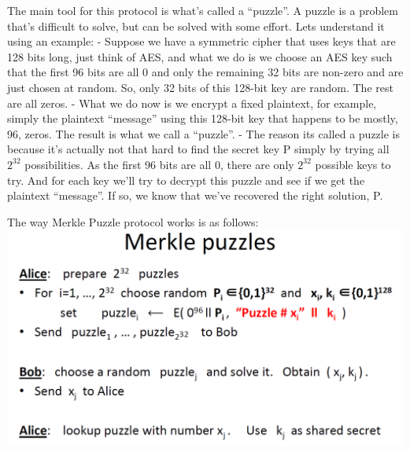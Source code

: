 \documentclass[11pt]{article}
\makeatletter
\def\maxwidth{\ifdim\Gin@nat@width>\linewidth\linewidth
    \else\Gin@nat@width\fi}
\let\Oldincludegraphics\includegraphics
\renewcommand{\includegraphics}[1]{\Oldincludegraphics[width=.8\maxwidth]{#1}}
\makeatother
\begin{document}
The main tool for this protocol is what's called a ``puzzle''. A puzzle
is a problem that's difficult to solve, but can be solved with some
effort. Lets understand it using an example: - Suppose we have a
symmetric cipher that uses keys that are 128 bits long, just think of
AES, and what we do is we choose an AES key such that the first 96 bits
are all 0 and only the remaining 32 bits are non-zero and are just
chosen at random. So, only 32 bits of this 128-bit key are random. The
rest are all zeros. - What we do now is we encrypt a fixed plaintext,
for example, simply the plaintext ``message'' using this 128-bit key
that happens to be mostly, 96, zeros. The result is what we call a
``puzzle''. - The reason its called a puzzle is because it's actually
not that hard to find the secret key P simply by trying all \(2^{32}\)
possibilities. As the first 96 bits are all 0, there are only \(2^{32}\)
possible keys to try. And for each key we'll try to decrypt this puzzle
and see if we get the plaintext ``message''. If so, we know that we've
recovered the right solution, P.

The way Merkle Puzzle protocol works is as follows:
\includegraphics{./Images/MP-Working.png}
\end{document}
